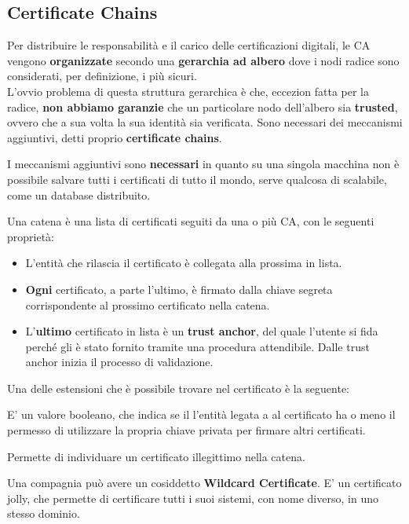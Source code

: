 \subsection{Certificate Chains}
Per distribuire le responsabilità e il carico delle certificazioni digitali, le CA vengono \textbf{organizzate} secondo una \textbf{gerarchia ad albero} dove i nodi radice sono considerati, per definizione, i più sicuri.\\
L'ovvio problema di questa struttura gerarchica è che, eccezion fatta per la radice, \textbf{non abbiamo garanzie} che un particolare nodo dell'albero sia \textbf{trusted}, ovvero che a sua volta la sua identità sia verificata. Sono necessari dei meccanismi aggiuntivi, detti proprio \textbf{certificate chains}.\\
\begin{remark}
I meccanismi aggiuntivi sono \textbf{necessari} in quanto su una singola macchina non è possibile salvare tutti i certificati di tutto il mondo, serve qualcosa di scalabile, come un database distribuito.
\end{remark}
\begin{definition}
Una catena è una lista di certificati seguiti da una o più CA, con le seguenti proprietà:
\begin{itemize}
    \item L'entità che rilascia il certificato è collegata alla prossima in lista. 
    \item \textbf{Ogni} certificato, a parte l'ultimo, è firmato dalla chiave segreta corrispondente al prossimo certificato nella catena.
    \item L'\textbf{ultimo} certificato in lista è un \textbf{trust anchor}, del quale l'utente si fida perché gli è stato fornito tramite una procedura attendibile. Dalle trust anchor inizia il processo di validazione.
\end{itemize}
\end{definition}
Una delle estensioni che è possibile trovare nel certificato è la seguente:
\begin{theorem}\label{thm:basiccons}
E' un valore booleano, che indica se il l'entità legata a al certificato ha o meno il permesso di utilizzare la propria chiave privata per firmare altri certificati.
\end{theorem}
\begin{remark}
Permette di individuare un certificato illegittimo nella catena.
\end{remark}
\begin{remark}
Una compagnia può avere un cosiddetto \textbf{Wildcard Certificate}. E' un certificato jolly, che permette di certificare tutti i suoi sistemi, con nome diverso, in uno stesso dominio.
\end{remark}
